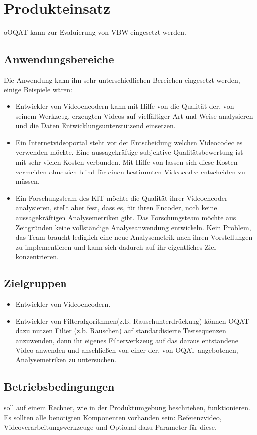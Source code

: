 \chapter{Produkteinsatz}
o\gls{OQAT} kann zur Evaluierung von \gls{VBW} eingesetzt werden. 
\section{Anwendungsbereiche}
Die Anwendung kann ihn sehr unterschiedlichen Bereichen eingesetzt werden, einige Beispiele wären:
\begin{itemize}
\item Entwickler von Videoencodern kann mit Hilfe von \projektTitel die Qualität der, von seinem
		Werkzeug, erzeugten Videos auf vielfältiger Art und Weise analysieren und die Daten
		Entwicklungsunterstützend einsetzen.
\item Ein Internetvideoportal steht vor der Entscheidung welchen Videocodec es verwenden möchte.
		Eine aussagekräftige subjektive Qualitätsbewertung ist mit sehr vielen Kosten verbunden.
		Mit Hilfe von \projektTitel lassen sich diese Kosten vermeiden ohne sich blind für
		einen bestimmten Videocodec entscheiden zu müssen.
\item Ein Forschungsteam des \gls{KIT} möchte die Qualität ihrer Videoencoder analysieren, stellt
		aber fest, dass es, für ihren Encoder, noch keine aussagekräftigen Analysemetriken gibt.
		Das Forschungsteam möchte aus Zeitgründen keine vollständige Analyseanwendung entwickeln.
		Kein Problem, das Team braucht lediglich \projektTitel eine neue Analysemetrik nach ihren
		Vorstellungen zu implementieren und kann sich dadurch auf ihr eigentliches Ziel konzentrieren. 
\end{itemize}
\section{Zielgruppen}
\begin{itemize}
\item Entwickler von Videoencodern.
\item Entwickler von Filteralgorithmen(z.B. Rauschunterdrückung) können \gls{OQAT} dazu nutzen Filter (z.b. Rauschen) auf standardisierte Testsequenzen anzuwenden, dann ihr eigenes Filterwerkzeug auf das daraus entstandene Video anwenden und anschließen von einer der, von \gls{OQAT} angebotenen, Analysemetriken zu untersuchen.
\end{itemize}
\section{Betriebsbedingungen}
\projektTitel soll auf einem Rechner, wie in der Produktumgebung beschrieben, funktionieren.
Es sollten alle benötigten Komponenten vorhanden sein:
Referenzvideo, Videoverarbeitungswerkzeuge und Optional dazu Parameter für diese.